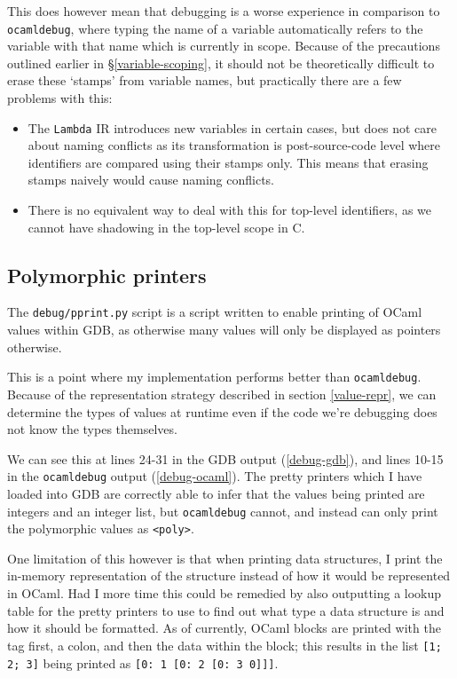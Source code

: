 \documentclass[12pt,a4paper,twoside,openright]{report}
\begin{document}
This does however mean that debugging is a worse experience in comparison to
\texttt{ocamldebug}, where typing the name of a variable automatically refers to
the variable with that name which is currently in scope. Because of the
precautions outlined earlier in \S\ref{variable-scoping}, it should not be
theoretically difficult to erase these `stamps' from variable names, but
practically there are a few problems with this:

\begin{itemize}
    \item The \texttt{Lambda} IR introduces new variables in certain cases, but 
    does not care about naming conflicts as its transformation is 
    post-source-code level where identifiers are compared using their stamps 
    only. This means that erasing stamps naively would cause naming conflicts.
    \item There is no equivalent way to deal with this for top-level 
    identifiers, as we cannot have shadowing in the top-level scope in C.
\end{itemize}

\subsection{Polymorphic printers}

The \texttt{debug/pprint.py} script is a script written to enable printing of 
OCaml values within GDB, as otherwise many values will only be displayed as 
pointers otherwise.

This is a point where my implementation performs better than 
\texttt{ocamldebug}. Because of the representation strategy described in section
\ref{value-repr}, we can determine the types of values at runtime even if the 
code we're debugging does not know the types themselves.

We can see this at lines 24-31 in the GDB output (\ref{debug-gdb}), and 
lines 10-15 in the \texttt{ocamldebug} output (\ref{debug-ocaml}). The 
pretty printers which I have loaded into GDB are correctly able to infer that 
the values being printed are integers and an integer list, but 
\texttt{ocamldebug} cannot, and instead can only print the polymorphic values 
as \texttt{<poly>}.

One limitation of this however is that when printing data structures, I print 
the in-memory representation of the structure instead of how it would be 
represented in OCaml. Had I more time this could be remedied by also outputting 
a lookup table for the pretty printers to use to find out what type a data 
structure is and how it should be formatted. As of currently, OCaml blocks are 
printed with the tag first, a colon, and then the data within the block; this 
results in the list \texttt{[1; 2; 3]} being printed as \texttt{[0: 1 [0: 2 [0: 
3 0]]]}.
\end{document}
